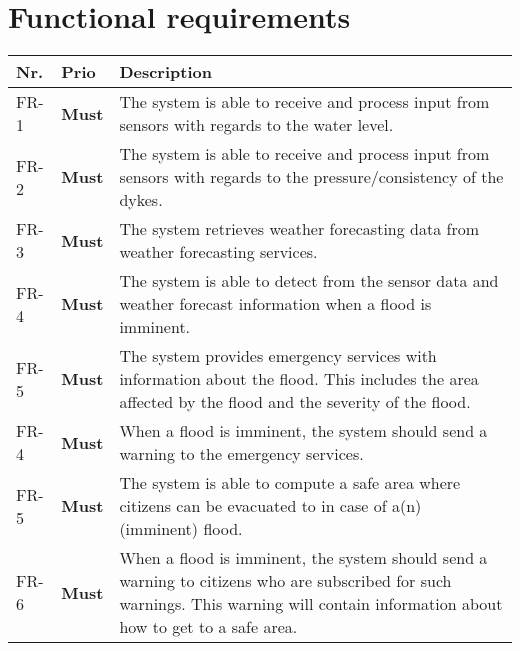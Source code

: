 \section{Functional requirements}
\begin{tabular}{p{} p{} p{}}
    \textbf{Nr.} & \textbf{Prio}  & \textbf{Description} \\
    
    \hline {} \label{fr:1} FR-1 & 
      \textbf{Must} &
      The system is able to receive and process input from sensors with regards to the water level. \\
    
    \hline {} \label{fr:2} FR-2 & 
      \textbf{Must} &
      The system is able to receive and process input from sensors with regards to the pressure/consistency of the dykes. \\
    
    \hline {} \label{fr:3} FR-3 & 
      \textbf{Must} &
      The system retrieves weather forecasting data from weather forecasting services. %
     \\
     
    \hline {} \label{fr:4} FR-4 & 
      \textbf{Must} &
      The system is able to detect from the sensor data and weather forecast information when a flood is imminent. \\
    
    \hline {} \label{fr:5} FR-5 & 
      \textbf{Must} &
     The system provides emergency services with information about the flood. This includes the area affected by the flood and the severity of the flood. \\
    
	\hline {} \label{fr:4} FR-4 & 
      \textbf{Must} &
      When a flood is imminent, the system should send a warning to the emergency services. \\
    
    \hline {} \label{fr:5} FR-5 & 
      \textbf{Must} &
      The system is able to compute a safe area where citizens can be evacuated to in case of a(n) (imminent) flood. \\    

    \hline {} \label{fr:6} FR-6 & 
      \textbf{Must} &
      When a flood is imminent, the system should send a warning to citizens who are subscribed for such warnings. This warning will contain information about how to get to a safe area. \\
	

\end{tabular}

